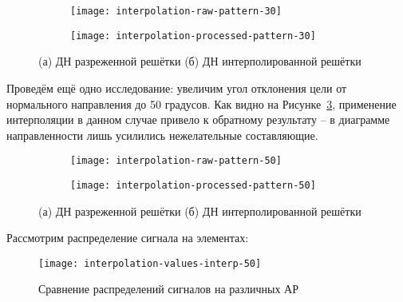 \begin{figure}[H]
    \centering
    \begin{subfigure}[b]{0.49\textwidth}
        \centering
        \hspace*{-3ex}
        \texttt{[image: interpolation-raw-pattern-30]}
        \caption{}%
    \end{subfigure}
    \hfill
    \begin{subfigure}[b]{0.49\textwidth}
        \centering
        \hspace*{-3ex}
        \texttt{[image: interpolation-processed-pattern-30]}
        \caption{}%
        \label{fig:interpolation-processed-pattern-30}
    \end{subfigure}
    \caption{%
    (а) ДН разреженной решётки
    (б) ДН интерполированной решётки
    }%
    \label{fig:interpolation-pattern-30}
\end{figure}

Проведём ещё одно исследование: увеличим угол отклонения цели от нормального направления до 50 градусов. 
Как видно на Рисунке~\ref{fig:interpolation-processed-pattern-50}, применение интерполяции в данном случае 
привело к обратному результату -- в диаграмме направленности лишь усилились нежелательные составляющие. 

\begin{figure}[H]
    \centering
    \begin{subfigure}[b]{0.49\textwidth}
        \centering
        \hspace*{-3ex}
        \texttt{[image: interpolation-raw-pattern-50]}
        \caption{}%
    \end{subfigure}
    \hfill
    \begin{subfigure}[b]{0.49\textwidth}
        \centering
        \hspace*{-3ex}
        \texttt{[image: interpolation-processed-pattern-50]}
        \caption{}%
        \label{fig:interpolation-processed-pattern-50}
    \end{subfigure}
    \caption{%
    (а) ДН разреженной решётки
    (б) ДН интерполированной решётки
    }%
    \label{fig:interpolation-pattern-50}
\end{figure}

Рассмотрим распределение сигнала на элементах:

\begin{figure}[H]
    \centering
    \texttt{[image: interpolation-values-interp-50]}
    \caption{Сравнение распределений сигналов на различных АР}
    \label{fig:interpolation-values-interp-50}
\end{figure}


